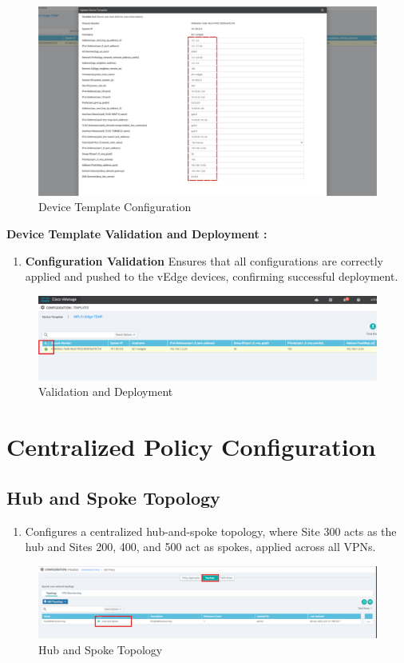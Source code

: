 \documentclass[12pt,english]{report}
\begin{document}
\begin{figure}[H]
    \centering
    \includegraphics[width= 1 \textwidth]{chapitre 3/template/dt8.png}
    \caption{Device Template Configuration}
    \label{Device Template Configuration}
\end{figure}
\textbf{Device Template Validation and Deployment :}
\begin{enumerate}
\item \textbf{Configuration Validation}
Ensures that all configurations are correctly applied and pushed to the vEdge devices, confirming successful deployment.
\end{enumerate}
\begin{figure}[H]
    \centering
    \includegraphics[width= 1.1 \textwidth]{chapitre 3/template/dt9.png}
    \caption{Validation and Deployment}
    \label{Validation and Deployment}
\end{figure}

\section{Centralized Policy Configuration}
\subsection{Hub and Spoke Topology}
\begin{enumerate}
\item Configures a centralized hub-and-spoke topology, where Site 300 acts as the hub and Sites 200, 400, and 500 act as spokes, applied across all VPNs.
\end{enumerate}
\begin{figure}[H]
    \centering
    \includegraphics[width= 1.1 \textwidth]{chapitre 3/template/ths1.png}
    \caption{Hub and Spoke Topology}
    \label{Hub and Spoke Topology}
\end{figure}
\end{document}
